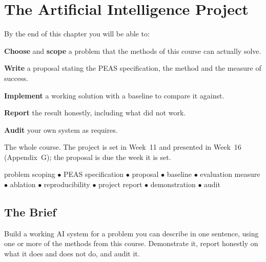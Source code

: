 \chapter{The Artificial Intelligence Project}\label{ch:project}

\begin{outcomes}
By the end of this chapter you will be able to:
\begin{tight}
  \item \textbf{Choose} and \textbf{scope} a problem that the methods of this
        course can actually solve.
  \item \textbf{Write} a proposal stating the PEAS specification, the method and
        the measure of success.
  \item \textbf{Implement} a working solution with a baseline to compare it
        against.
  \item \textbf{Report} the result honestly, including what did not work.
  \item \textbf{Audit} your own system as  requires.
\end{tight}
\end{outcomes}

\begin{prereq}
The whole course. The project is set in Week~11 and presented in Week~16
(Appendix~G); the proposal is due the week it is set.
\end{prereq}

\begin{keyterms}
problem scoping $\bullet$ PEAS specification $\bullet$ proposal $\bullet$ baseline
$\bullet$ evaluation measure $\bullet$ ablation $\bullet$ reproducibility $\bullet$
project report $\bullet$ demonstration $\bullet$ audit
\end{keyterms}

\section{The Brief}

Build a working AI system for a problem you can describe in one sentence, using one
or more of the methods from this course. Demonstrate it, report honestly on what it
does and does not do, and audit it.

